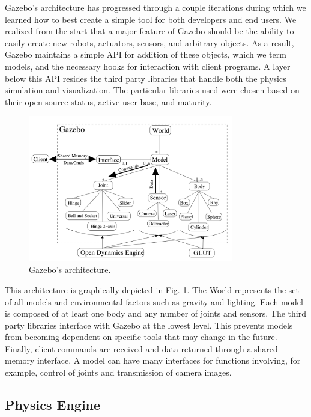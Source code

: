 Gazebo's architecture has progressed through a couple iterations during which we learned how to best create a simple tool for both developers and end users. We realized from the start that a major feature of Gazebo should be the ability to easily create new robots, actuators, sensors, and arbitrary objects. As a result, Gazebo maintains a simple API for addition of these objects, which we term models, and the necessary hooks for interaction with client programs. A layer below this API resides the third party libraries that handle both the physics simulation and visualization. The particular libraries used were chosen based on their open source status, active user base, and maturity.

\begin{figure}[h]
\centering
\includegraphics[width=0.8\textwidth]{figs/ch2/gazebo-structure}
\caption{Gazebo's architecture.}
\label{fig:gazebo-structure}
\end{figure}

This architecture is graphically depicted in Fig. \ref{fig:gazebo-structure}. The World represents the set of all models and environmental factors such as gravity and lighting. Each model is composed of at least one body and any number of joints and sensors. The third party libraries interface with Gazebo at the lowest level. This prevents models from becoming dependent on specific tools that may change in the future. Finally, client commands are received and data returned through a shared memory interface. A model can have many interfaces for functions involving, for example, control of joints and transmission of camera images.

\subsection{Physics Engine}

